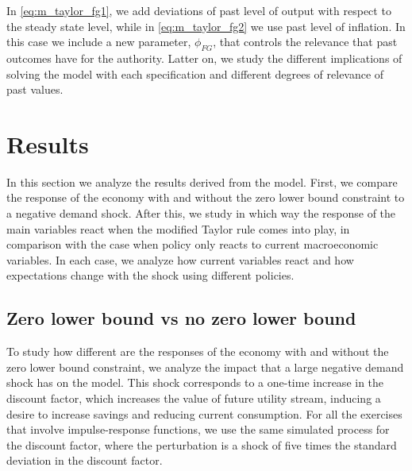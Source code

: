 \documentclass[11pt]{article}
\numberwithin{equation}{section}
\begin{document}
In \eqref{eq:m_taylor_fg1}, we add deviations of past level of output with respect to the steady state level, while in \eqref{eq:m_taylor_fg2} we use past level of inflation. In this case we include a new parameter, $\phi_{FG}$, that controls the relevance that past outcomes have for the authority. Latter on, we study the different implications of solving the model with each specification and different degrees of relevance of past values.

\section{Results}\label{sec:results}

In this section we analyze the results derived from the model. First, we compare the response of the economy with and without the zero lower bound constraint to a negative demand shock. After this, we study in which way the response of the main variables react when the modified Taylor rule comes into play, in comparison with the case when policy only reacts to current macroeconomic variables. In each case, we analyze how current variables react and how expectations change with the shock using different policies.

\subsection{Zero lower bound vs no zero lower bound}

To study how different are the responses of the economy with and without the zero lower bound constraint, we analyze the impact that a large negative demand shock has on the model. This shock corresponds to a one-time increase in the discount factor, which increases the value of future utility stream, inducing a desire to increase savings and reducing current consumption. For all the exercises that involve impulse-response functions, we use the same simulated process for the discount factor, where the perturbation is a shock of five times the standard deviation in the discount factor.
\end{document}
